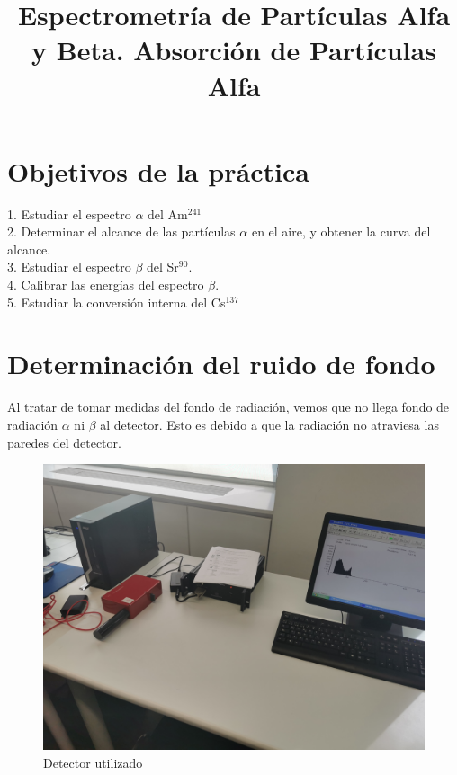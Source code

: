 \documentclass[a4paper,12pt,spanish]{article}
\begin{document}
	
	
	\title{ Espectrometría de Partículas Alfa y Beta. Absorción de Partículas Alfa}
	
	\date{}
	
	\maketitle
	
	
	\section{Objetivos de la práctica}
	
	\vspace{\baselineskip}
	
	1. Estudiar el espectro $\alpha$ del Am$^{241}$\\
	
	2. Determinar el alcance de las partículas $\alpha$ en el aire, y obtener la curva del alcance.\\
	
	3. Estudiar el espectro $\beta$ del Sr$^{90}$.\\
	
	4. Calibrar las energías del espectro $\beta$.\\
	
	5. Estudiar la conversión interna del Cs$^{137}$\\
	
	
	\section{Determinación del ruido de fondo}
	
	Al tratar de tomar medidas del fondo de radiación, vemos que no llega fondo de radiación $\alpha$ ni $\beta$ al detector. Esto es debido a que la radiación no atraviesa las paredes del detector.
	
	
\begin{figure}[H]
	\centering
	\includegraphics[width=0.7\linewidth]{imagenes/IMG_20240305_161034}
	\caption{Detector utilizado}
	\label{fig:img20240305161034}
\end{figure}
	
\end{document}
